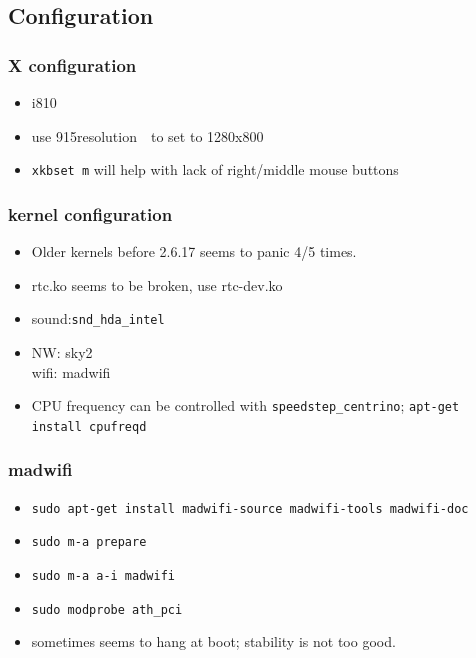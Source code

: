 \documentclass[cjk,dvipdfmx]{beamer}
\begin{document}
\subsection{Configuration}

\begin{frame}
 \frametitle{X configuration}
\begin{itemize}
 \item i810
 \item use 915resolution　to set to 1280x800
 \item \texttt{xkbset m} will help with lack of right/middle mouse buttons
\end{itemize}
\end{frame}

\begin{frame}
 \frametitle{kernel configuration}
\begin{itemize}
 \item Older kernels before 2.6.17 seems to panic 4/5 times.
 \item rtc.ko seems to be broken, use rtc-dev.ko
 \item sound:\texttt{snd\_hda\_intel}
 \item NW: sky2\\
       wifi: madwifi
 \item CPU frequency can be controlled with \texttt{speedstep\_centrino};
       \texttt{apt-get install cpufreqd}
\end{itemize}
\end{frame}

\begin{frame}
 \frametitle{madwifi}
 \begin{itemize}
  \item \texttt{sudo apt-get install madwifi-source madwifi-tools madwifi-doc}
  \item \texttt{sudo m-a prepare}
  \item \texttt{sudo m-a a-i madwifi}
  \item \texttt{sudo modprobe ath\_pci}
  \item<2-> sometimes seems to hang at boot; stability is not too good.
 \end{itemize}
\end{frame}
\end{document}
